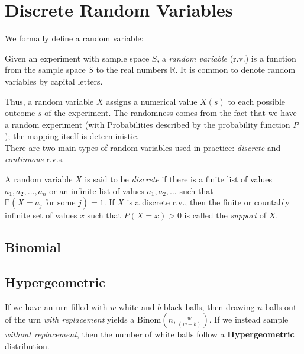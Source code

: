 \documentclass{article}
\begin{document}
\section{Discrete Random Variables}

We formally define a random variable:

\begin{definition}
    Given an experiment with sample space $S$, a \textit{random variable} (r.v.) is a function from the sample space $S$ to the real numbers $\mathbb{R}$. It is common to denote random variables by capital letters. 
\end{definition}

\noindent Thus, a random variable $X$ assigns a numerical value $X(s)$ to each possible outcome $s$ of the experiment. The randomness comes from the fact that we have a random experiment (with Probabilities described by the probability function $P$); the mapping itself is deterministic. \\

There are two main types of random variables used in practice: \textit{discrete} and \textit{continuous} r.v.s. 

\begin{definition}
    A random variable $X$ is said to be \textit{discrete} if there is a finite list of values $a_{1}, a_{2}, \dots, a_n$ or an infinite list of values $a_{1}, a_{2}, \dots$ such that $\mathbb{P}(X = a_j \; \text{for some }j) = 1$. If $X$ is a discrete r.v., then the finite or countably infinite set of values $x$ such that $P(X = x) > 0$ is called the \textit{support} of $X$.  
\end{definition}







\subsection{Binomial}

\subsection{Hypergeometric}

If we have an urn filled with $w$ white and $b$ black balls, then drawing $n$ balls out of the urn \textit{with replacement} yields a $\text{Binom}(n, \frac{w}{(w+b)})$. If we instead sample \textit{without replacement}, then the number of white balls follow a \textbf{Hypergeometric} distribution. 
\end{document}

